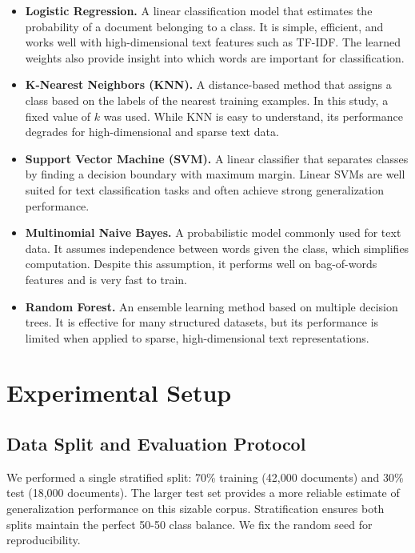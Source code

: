 \documentclass[12pt]{article}
\begin{document}
\begin{itemize}
  \item \textbf{Logistic Regression.} A linear classification model that estimates the probability of a document belonging to a class. It is simple, efficient, and works well with high-dimensional text features such as TF-IDF. The learned weights also provide insight into which words are important for classification.
  
  \item \textbf{K-Nearest Neighbors (KNN).} A distance-based method that assigns a class based on the labels of the nearest training examples. In this study, a fixed value of $k$ was used. While KNN is easy to understand, its performance degrades for high-dimensional and sparse text data.
  
  \item \textbf{Support Vector Machine (SVM).} A linear classifier that separates classes by finding a decision boundary with maximum margin. Linear SVMs are well suited for text classification tasks and often achieve strong generalization performance.
  
  \item \textbf{Multinomial Naive Bayes.} A probabilistic model commonly used for text data. It assumes independence between words given the class, which simplifies computation. Despite this assumption, it performs well on bag-of-words features and is very fast to train.
  
  \item \textbf{Random Forest.} An ensemble learning method based on multiple decision trees. It is effective for many structured datasets, but its performance is limited when applied to sparse, high-dimensional text representations.
\end{itemize}


\section{Experimental Setup}
\subsection{Data Split and Evaluation Protocol}
We performed a single stratified split: 70\% training (42,000 documents) and 30\% test (18,000 documents). The larger test set provides a more reliable estimate of generalization performance on this sizable corpus. Stratification ensures both splits maintain the perfect 50-50 class balance. We fix the random seed for reproducibility.
\end{document}
